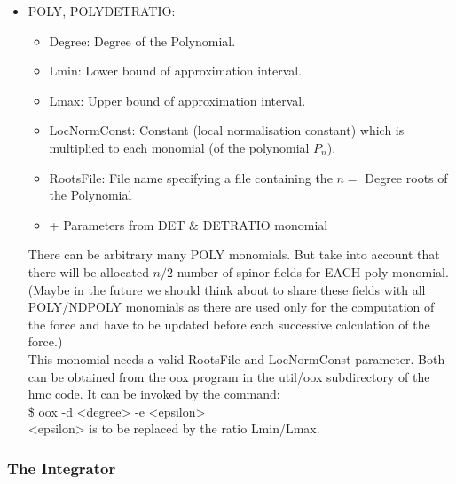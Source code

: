 \begin{itemize}
\item {\ttfamily POLY, POLYDETRATIO}:
  \begin{itemize}
  \item {\ttfamily Degree}:
    Degree of the Polynomial.
  \item {\ttfamily Lmin}:
    Lower bound of approximation interval.
  \item {\ttfamily Lmax}:
    Upper bound of approximation interval.
  \item {\ttfamily LocNormConst}:
    Constant (local normalisation constant) which is multiplied to each monomial (of the polynomial $P_n$).
  \item {\ttfamily RootsFile}:
    File name specifying a file containing the $n=$ {\ttfamily Degree} roots of the Polynomial
  \item {\ttfamily + Parameters from DET \& DETRATIO monomial}
  \end{itemize}
There can be arbitrary many POLY monomials. But take into account that there will be allocated $n/2$ number of spinor fields for EACH poly monomial. (Maybe in the future we should think about to share these fields with all POLY/NDPOLY monomials as there are used only for the computation of the force and have to be updated before each successive calculation of the force.)\\
This monomial needs a valid {\ttfamily RootsFile} and {\ttfamily LocNormConst} parameter. Both can be obtained from the {\ttfamily oox} program in the {\ttfamily util/oox} subdirectory of the hmc code. It can be invoked by the command:\\
{\ttfamily \$ oox -d <degree> -e <epsilon>}\\
{\ttfamily <epsilon>} is to be replaced by the ratio  {\ttfamily Lmin/Lmax}.
\end{itemize}

\subsubsection{The Integrator}

